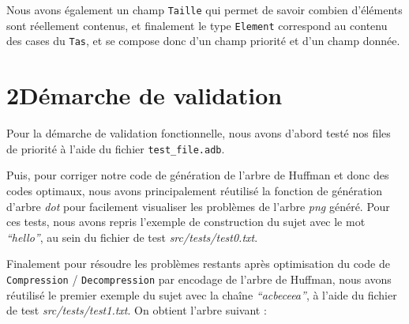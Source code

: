 \documentclass [a4paper,11pt] {report}
\begin{document}
Nous avons également un champ \lstinline!Taille! qui permet de savoir combien d'éléments sont réellement contenus, et finalement le type \lstinline!Element! correspond au contenu des cases du \lstinline!Tas!, et se compose donc d'un champ priorité et d'un champ donnée.





\section* {2\hspace{5mm}Démarche de validation }

Pour la démarche de validation fonctionnelle, nous avons d'abord testé nos files de priorité à l'aide du fichier \lstinline!test_file.adb!.

Puis, pour corriger notre code de génération de l'arbre de Huffman et donc des codes optimaux, nous avons principalement réutilisé la fonction de génération d'arbre \textit{dot} pour facilement visualiser les problèmes de l'arbre \textit{png} généré. Pour ces tests, nous avons repris l'exemple de construction du sujet avec le mot \textit{``hello''}, au sein du fichier de test \textit{src/tests/test0.txt}.

\newpage

Finalement pour résoudre les problèmes restants après optimisation du code de \lstinline!Compression! / \lstinline!Decompression! par encodage de l'arbre de Huffman, nous avons réutilisé le premier exemple du sujet avec la chaîne \textit{``acbeceea''}, à l'aide du fichier de test \textit{src/tests/test1.txt}. On obtient l'arbre suivant :
\end{document}
